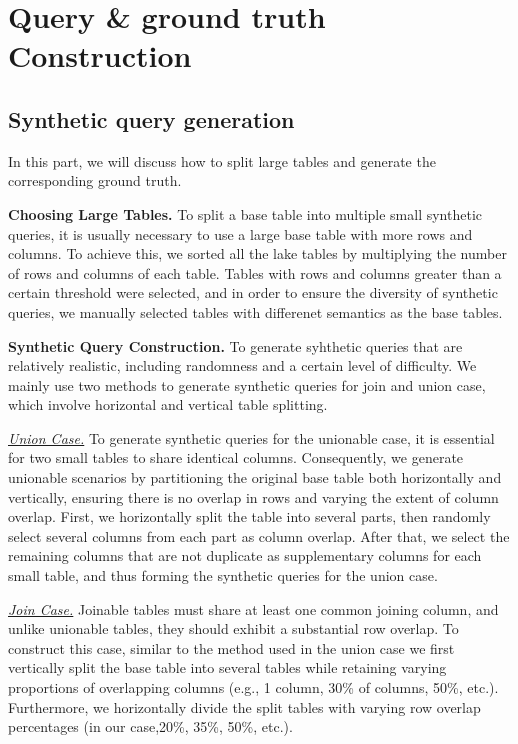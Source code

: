 \section{Query \& ground truth Construction}

\subsection{Synthetic query generation}
In this part, we will discuss how to split large tables and generate the corresponding ground truth.

\noindent \textbf{Choosing Large Tables.} 
To split a base table into multiple small synthetic queries, it is usually necessary to use a large base table with more rows and columns. To achieve this, we sorted all the lake tables by multiplying the number of rows and columns of each table. Tables with rows and columns greater than a certain threshold were selected, and in order to ensure the diversity of synthetic queries, we manually selected tables with differenet semantics as the base tables.

\noindent \textbf{Synthetic Query Construction.} 
To generate syhthetic queries that are relatively realistic, including randomness and a certain level of difficulty. We mainly use two methods to generate synthetic queries for join and union case, which involve horizontal and vertical table splitting.

\noindent \underline{\textit{Union Case.}}  To generate synthetic queries for the unionable case, it is essential for two small tables to share identical columns. Consequently, we generate unionable scenarios by partitioning the original base table both horizontally and vertically, ensuring there is no overlap in rows and varying the extent of column overlap. First, we horizontally split the table into several parts, then randomly select several columns from each part as column overlap. After that, we select the remaining columns that are not duplicate as supplementary columns for each small table, and thus forming the synthetic queries for the union case.

\noindent \underline{\textit{Join Case.}}  Joinable tables must share at least one common joining column, and unlike unionable tables, they should exhibit a substantial row overlap. To construct this case, similar to the method used in the union case we first vertically split the base table into several tables while retaining varying proportions of overlapping columns (e.g., 1 column, 30\% of columns, 50\%, etc.). Furthermore, we horizontally divide the split tables with varying row overlap percentages (in our case,20\%, 35\%, 50\%, etc.). 


